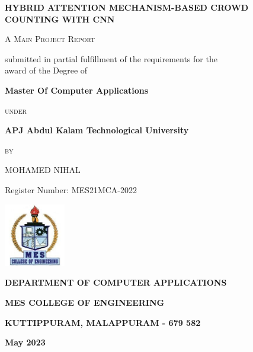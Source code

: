 \documentclass[12pt]{report}
\begin{document}
\begin{titlepage}
	\pagestyle{fancy}
	\fancyhead{} %
	\fancyfoot{} %
	
	\setlength{\headheight}{80pt} %
	\setlength{\footskip}{30pt} %
	\centering
	
	{\LARGE\bfseries{HYBRID ATTENTION MECHANISM-BASED CROWD COUNTING WITH CNN} \par}
	\vspace{0.8cm}
	{\scshape\Large A Main Project Report\par}
	{\large submitted in partial fulfillment of the requirements for the\\ award of the Degree of \par}
	\vspace{0.5 cm}
	{\large\bfseries Master Of Computer Applications\par}
	{\scshape\large under \par}
	{\large\bfseries APJ Abdul Kalam Technological University \par}
	\vspace{0.8 cm}
	{\scshape\large by \par}
	{\Large MOHAMED NIHAL\par}
	{\Large Register Number: MES21MCA-2022 \par}
	\vspace{0.8cm}
	
	\includegraphics[width=0.2\textwidth]{MESCE.jpg}\par\vspace{0.8cm}
	
	{\large\bfseries DEPARTMENT OF COMPUTER APPLICATIONS\par}
	{\large\bfseries MES COLLEGE OF ENGINEERING\par}
	{\small\bfseries KUTTIPPURAM, MALAPPURAM - 679 582\par}
	
	\vspace{0.3cm}
	
	{\large \bfseries May 2023 \par}
\end{titlepage}
\end{document}
